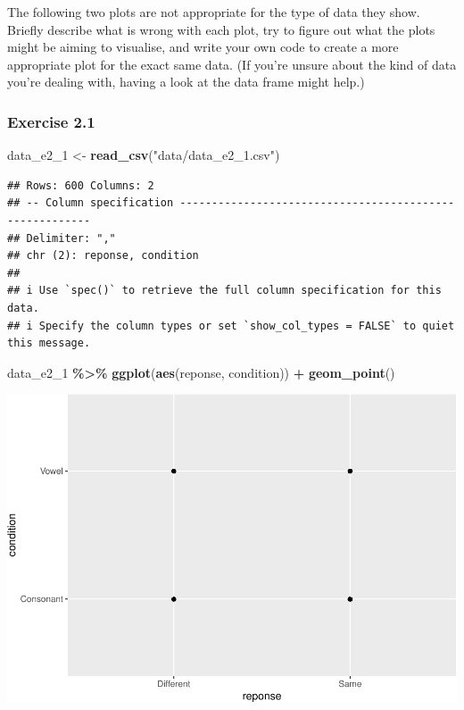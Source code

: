 \documentclass[
]{article}
\newenvironment{Shaded}{\begin{snugshade}}{\end{snugshade}}
\newcommand{\FunctionTok}[1]{\textcolor[rgb]{0.13,0.29,0.53}{\textbf{#1}}}
\newcommand{\NormalTok}[1]{#1}
\newcommand{\OtherTok}[1]{\textcolor[rgb]{0.56,0.35,0.01}{#1}}
\newcommand{\SpecialCharTok}[1]{\textcolor[rgb]{0.81,0.36,0.00}{\textbf{#1}}}
\newcommand{\StringTok}[1]{\textcolor[rgb]{0.31,0.60,0.02}{#1}}
\begin{document}
The following two plots are not appropriate for the type of data they
show. Briefly describe what is wrong with each plot, try to figure out
what the plots might be aiming to visualise, and write your own code to
create a more appropriate plot for the exact same data. (If you're
unsure about the kind of data you're dealing with, having a look at the
data frame might help.)

\subsubsection{Exercise 2.1}\label{exercise-2.1}

\begin{Shaded}
\begin{Highlighting}[]
\NormalTok{data\_e2\_1 }\OtherTok{\textless{}{-}} \FunctionTok{read\_csv}\NormalTok{(}\StringTok{"data/data\_e2\_1.csv"}\NormalTok{)}
\end{Highlighting}
\end{Shaded}

\begin{verbatim}
## Rows: 600 Columns: 2
## -- Column specification --------------------------------------------------------
## Delimiter: ","
## chr (2): reponse, condition
## 
## i Use `spec()` to retrieve the full column specification for this data.
## i Specify the column types or set `show_col_types = FALSE` to quiet this message.
\end{verbatim}

\begin{Shaded}
\begin{Highlighting}[]
\NormalTok{data\_e2\_1 }\SpecialCharTok{\%\textgreater{}\%}
  \FunctionTok{ggplot}\NormalTok{(}\FunctionTok{aes}\NormalTok{(reponse, condition)) }\SpecialCharTok{+}
  \FunctionTok{geom\_point}\NormalTok{()}
\end{Highlighting}
\end{Shaded}

\includegraphics{analysis_files/figure-latex/e2-1-1.pdf}
\end{document}
